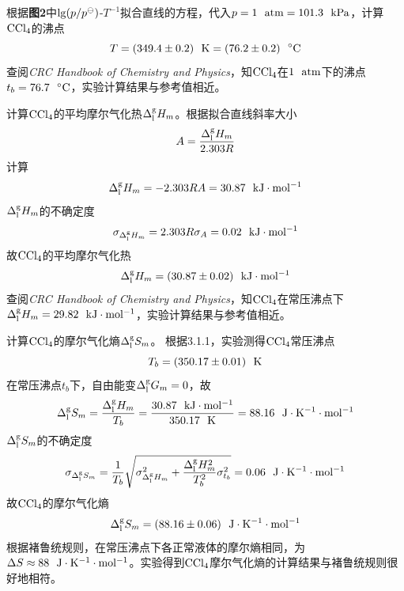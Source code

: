 \documentclass[12pt]{article}
\begin{document}
根据\textbf{图2}中${\rm lg}(p/p^{\ominus})$-$T^{-1}$拟合直线的方程，代入$p=1\ \ {\rm atm}=101.3\ \ {\rm kPa}$，计算$\rm CCl_{4}$的沸点
$$
T=(349.4\pm 0.2)\ \ {\rm K}=(76.2\pm 0.2)\ \ {\rm ^{\circ}C}  
$$
查阅\textit{CRC Handbook of Chemistry and Physics}\citealp{crc}，知$\rm CCl_{4}$在$\rm 1\ \ atm$下的沸点$t_{b}=76.7\ \ {\rm ^{\circ}C}$，实验计算结果与参考值相近。\par 
计算$\rm CCl_{4}$的平均摩尔气化热$\Delta^{\rm g}_{\rm l}H_{m}$。根据拟合直线斜率大小
$$
A=\frac{\Delta^{\rm g}_{\rm l}H_{m}}{2.303R}
$$
计算
$$
\Delta^{\rm g}_{\rm l}H_{m}=-2.303RA=30.87\ \ {\rm kJ\cdot mol^{-1}}
$$
$\Delta^{\rm g}_{\rm l}H_{m}$的不确定度
$$
\sigma_{\Delta^{\rm g}_{\rm l}H_{m}}=2.303R\sigma_{A}=0.02\ \ {\rm kJ\cdot mol^{-1}}
$$
故$\rm CCl_{4}$的平均摩尔气化热
$$
\Delta^{\rm g}_{\rm l}H_{m}=(30.87\pm 0.02)\ \ {\rm kJ\cdot mol^{-1}}
$$
查阅\textit{CRC Handbook of Chemistry and Physics}\citealp{crc}，知$\rm CCl_{4}$在常压沸点下$\Delta^{\rm g}_{\rm l}H_{m}=29.82\ \ {\rm kJ\cdot mol^{-1}}$，实验计算结果与参考值相近。
\par
计算$\rm CCl_{4}$的摩尔气化熵$\Delta^{\rm g}_{\rm l}S_{m}$。
根据3.1.1，实验测得$\rm CCl_{4}$常压沸点
$$
T_{b}=(350.17\pm 0.01)\ \ {\rm K}
$$
在常压沸点$t_{b}$下，自由能变$\Delta^{\rm g}_{\rm l}G_{m}=0$，故
$$
\Delta^{\rm g}_{\rm l}S_{m}=\frac{\Delta^{\rm g}_{\rm l}H_{m}}{T_{b}}=\frac{30.87\ \ {\rm kJ\cdot mol^{-1}}}{350.17\ \ {\rm K}}=88.16\ \ {\rm J\cdot K^{-1} \cdot mol^{-1}}
$$
$\Delta^{\rm g}_{\rm l}S_{m}$的不确定度
$$
\sigma_{\Delta^{\rm g}_{\rm l}S_{m}}=\frac{1}{T_{b}} \sqrt{\sigma^{2}_{\Delta^{\rm g}_{\rm l}H_{m}}+\frac{\Delta^{\rm g}_{\rm l}H_{m}^{2}}{T_{b}^{2}}\sigma^{2}_{t_{b}}}=0.06\ \ {\rm J\cdot K^{-1}\cdot mol^{-1}}
$$
故$\rm CCl_{4}$的摩尔气化熵
$$
\Delta^{\rm g}_{\rm l}S_{m}=(88.16\pm 0.06)\ \ {\rm J\cdot K^{-1} \cdot mol^{-1}}
$$
根据褚鲁统规则，在常压沸点下各正常液体的摩尔熵相同，为$\Delta S\approx 88\ \ {\rm J\cdot K^{-1}\cdot mol^{-1}}$。实验得到$\rm CCl_{4}$摩尔气化熵的计算结果与褚鲁统规则很好地相符。
\end{document}
